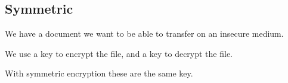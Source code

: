 
\subsection{Symmetric}

We have a document we want to be able to transfer on an insecure medium.

We use a key to encrypt the file, and a key to decrypt the file.

With symmetric encryption these are the same key.

